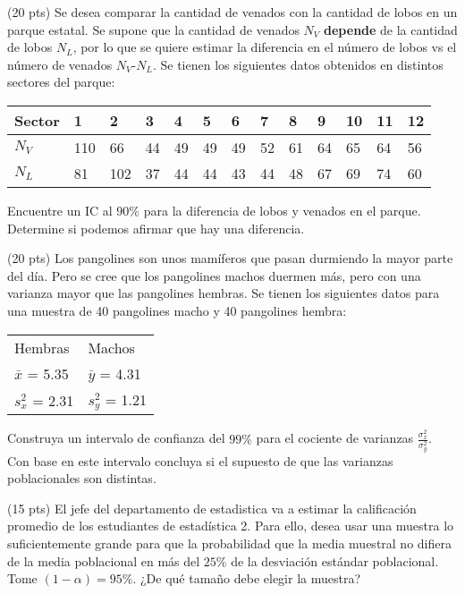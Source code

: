 \documentclass[addpoints]{exam}
\theoremstyle{mytheor}
\begin{document}
  \begin{questions} 
  
  \question (20 pts) Se desea comparar la cantidad de venados con la cantidad de lobos en un parque estatal. Se supone que la cantidad de venados $N_V$ \textbf{depende} de la cantidad de lobos $N_L$, por lo que se quiere estimar la diferencia en el número de lobos vs el número de venados $N_V$-$N_L$. Se tienen los siguientes datos obtenidos en distintos sectores del parque:

\begin{table}[h]
\centering
\begin{tabular}{lllllllllllll}
Sector & 1 & 2 & 3 & 4 & 5 & 6 & 7 & 8 & 9 & 10 & 11 & 12 \\ \hline
$N_V$ & 110 & 66 & 44 & 49 & 49 & 49 & 52 & 61 & 64 & 65 & 64 & 56 \\
$N_L$ & 81 & 102 & 37 & 44 & 44 & 43 & 44 & 48 & 67 & 69 & 74 & 60
\end{tabular}
\end{table}

Encuentre un IC al $90\%$ para la diferencia de lobos y venados en el parque. Determine si podemos afirmar que hay una diferencia. 

\question (20 pts)
Los pangolines son unos mamíferos que pasan durmiendo la mayor parte del día. Pero se cree que los pangolines machos duermen más, pero con una varianza mayor que las pangolines hembras. Se tienen los siguientes datos para una muestra de 40 pangolines macho y 40 pangolines hembra:

\begin{table}[h]
\centering
\begin{tabular}{ll}
Hembras & Machos \\
$\bar{x}$ = 5.35 & $\bar{y}$ = 4.31 \\
$s_x^2$ = 2.31 & $s_y^2$ = 1.21
\end{tabular}
\end{table}

Construya un intervalo de confianza del $99\%$ para el cociente de varianzas $\frac{\sigma_x^2}{\sigma_y^2}$. Con base en este intervalo concluya si el supuesto de que las varianzas poblacionales son distintas.

\question (15 pts) El jefe del departamento de estadistica va a estimar la calificación promedio de los estudiantes de estadística 2. Para ello, desea usar una muestra lo suficientemente grande para que la probabilidad que la media muestral no difiera de la media poblacional en más del $25\%$ de la desviación estándar poblacional. Tome $(1-\alpha)= 95\%$. ¿De qué tamaño debe elegir la muestra? 


\end{questions}
\end{document}
